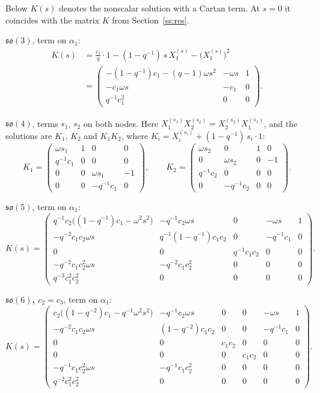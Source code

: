 \documentclass[12pt,a4paper]{article}
\newcommand{\so}{\mathfrak{so}}
\begin{document}
Below $K(s)$ denotes the nonscalar solution with a Cartan term. At $s=0$ it coincides with the matrix $K$
from Section~\ref{ss:res}.

\textbf{$\so(3)$}, term on $\alpha_1$:
\begin{align*}
K(s)&=\frac{c_1}{q}\cdot1-(1-q^{-1})\,s\,X^{(s)}_1-\bigl(X^{(s)}_1\bigr)^2\\
&=\begin{pmatrix}
-(1-q^{-1})c_1-(q-1)\omega s^2 & -\omega s & 1 \\
-c_1\omega s & -c_1 & 0 \\
q^{-1}c_1^{2} & 0 & 0
\end{pmatrix}.
\end{align*}

\textbf{$\so(4)$}, terms $s_1$, $s_2$ on both nodes. Here $X^{(s_1)}_1X^{(s_2)}_2=X^{(s_2)}_2X^{(s_1)}_1$, and
the solutions are $K_1$, $K_2$ and $K_1K_2$, where $K_i=X^{(s_i)}_i+(1-q^{-1})\,s_i\cdot1$:
\[
K_1=\begin{pmatrix}
\omega s_1 & 1 & 0 & 0 \\
q^{-1}c_1 & 0 & 0 & 0 \\
0 & 0 & \omega s_1 & -1 \\
0 & 0 & -q^{-1}c_1 & 0
\end{pmatrix},\qquad
K_2=\begin{pmatrix}
\omega s_2 & 0 & 1 & 0 \\
0 & \omega s_2 & 0 & -1 \\
q^{-1}c_2 & 0 & 0 & 0 \\
0 & -q^{-1}c_2 & 0 & 0
\end{pmatrix}.
\]

\textbf{$\so(5)$}, term on $\alpha_1$:
{\setlength{\arraycolsep}{2.5pt}
\[
K(s)=\begin{pmatrix}
q^{-1}c_2\bigl((1-q^{-1})c_1-\omega^2s^2\bigr) & -q^{-1}c_2\omega s & 0 & -\omega s & 1 \\
-q^{-2}c_1c_2\omega s & q^{-1}(1-q^{-1})c_1c_2 & 0 & -q^{-1}c_1 & 0 \\
0 & 0 & q^{-1}c_1c_2 & 0 & 0 \\
-q^{-2}c_1c_2^{2}\omega s & -q^{-2}c_1c_2^{2} & 0 & 0 & 0 \\
q^{-3}c_1^{2}c_2^{2} & 0 & 0 & 0 & 0
\end{pmatrix}.
\]
}

\textbf{$\so(6)$, $c_2=c_3$}, term on $\alpha_1$:
{\setlength{\arraycolsep}{4pt}
\[
K(s)=\begin{pmatrix}
c_2\bigl((1-q^{-2})c_1-q^{-1}\omega^2s^2\bigr) & -q^{-1}c_2\omega s & 0 & 0 & -\omega s & 1 \\
-q^{-2}c_1c_2\omega s & (1-q^{-2})c_1c_2 & 0 & 0 & -q^{-1}c_1 & 0 \\
0 & 0 & c_1c_2 & 0 & 0 & 0 \\
0 & 0 & 0 & c_1c_2 & 0 & 0 \\
-q^{-1}c_1c_2^{2}\omega s & -q^{-1}c_1c_2^{2} & 0 & 0 & 0 & 0 \\
q^{-2}c_1^{2}c_2^{2} & 0 & 0 & 0 & 0 & 0
\end{pmatrix}.
\]
}
\end{document}
